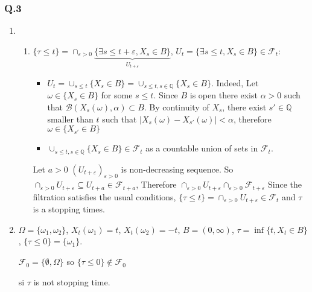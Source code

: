 \documentclass[12pt]{article}
\newcommand{\Q}[1]{\subsubsection*{Q.#1}}
\begin{document}
\Q{3}
\begin{enumerate}
\item 
  \begin{enumerate}
  \item
    $\{ \tau \le t \} = \cap_{\varepsilon > 0} \underbrace{\{ \exists s \le t + \varepsilon, X_s \in B \}}_{U_{t+\varepsilon}}$,
    $U_t = \{ \exists s \le t, X_s \in B \} \in \mathcal F_t$:
    \begin{itemize}
    \item $U_t = \cup_{s \le t} \{X_s \in B \} = \cup_{s \le t, s \in \mathbb Q} \{ X_s \in B \}$. Indeed,
      Let $\omega \in \{ X_s \in B \}$ for some $s \le t$. Since $B$ is open there exist $\alpha > 0$
      such that $\mathcal B(X_s(\omega), \alpha) \subset B$.
      By continuity of $X_s$, there exist $s' \in \mathbb Q$ smaller than $t$ such that $|X_s(\omega) - X_{s'}(\omega)| < \alpha$,
      therefore $\omega \in \{ X_{s'} \in B\}$
    \item $\cup_{s \le t, s \in \mathbb Q} \{ X_s \in B \} \in \mathcal F_t$ as a countable union of sets in $\mathcal F_t$.
    \end{itemize}
    Let $a > 0$
    $(U_{t + \varepsilon})_{\varepsilon > 0}$ is non-decreasing sequence. So $\cap_{\varepsilon > 0} U_{t + \varepsilon} \subseteq U_{t + a} \in \mathcal F_{t+a}$,
    Therefore $\cap_{\varepsilon > 0} U_{t + \varepsilon} \cap_{\varepsilon > 0} \mathcal F_{t+\varepsilon}$
    Since the filtration satisfies the usual conditions, $\{\tau \le t\} = \cap_{\varepsilon > 0} U_{t + \varepsilon}  \in \mathcal F_t$ and $\tau$ is a stopping times.
  \end{enumerate}
\item
  $\Omega = \{ \omega_1, \omega_2 \}$,
  $X_t(\omega_1) = t$,
  $X_t(\omega_2) = -t$,
  $B = (0, \infty)$, $\tau = \inf \{ t , X_t \in B\}$,
  $\{\tau \le 0\} = \{ \omega_1 \}$.

  
  $\mathcal F_0 = \{ \emptyset, \Omega \}$
  so $\{\tau \le 0 \} \not \in \mathcal F_0$
  
  si $\tau$ is not stopping time.
  
\end{enumerate}
\end{document}
